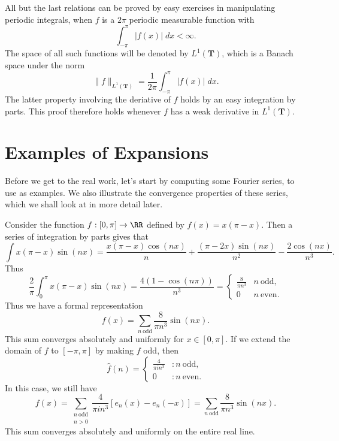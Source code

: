 All but the last relations can be proved by easy exercises in manipulating periodic integrals, when $f$ is a $2\pi$ periodic measurable function with
%
\[ \int_{-\pi}^\pi |f(x)|\; dx < \infty. \]
%
The space of all such functions will be denoted by $L^1(\mathbf{T})$, which is a Banach space under the norm
%
\[ \| f \|_{L^1(\mathbf{T})} = \frac{1}{2\pi} \int_{-\pi}^\pi |f(x)|\; dx. \]
%
The latter property involving the deriative of $f$ holds by an easy integration by parts. This proof therefore holds whenever $f$ has a weak derivative in $L^1(\mathbf{T})$.

\section{Examples of Expansions}

Before we get to the real work, let's start by computing some Fourier series, to use as examples. We also illustrate the convergence properties of these series, which we shall look at in more detail later.

\begin{example}
    Consider the function $f: [0,\pi] \to \RR$ defined by $f(x) = x(\pi - x)$. Then a series of integration by parts gives that
    \[ \int x(\pi - x) \sin(nx) = \frac{x(\pi - x) \cos(nx)}{n} + \frac{(\pi - 2x) \sin(nx)}{n^2} - \frac{2\cos(nx)}{n^3}. \]
    Thus
    \[ \frac{2}{\pi} \int_0^\pi x(\pi - x) \sin(nx) = \frac{4(1 - \cos(n\pi))}{n^3} = \begin{cases} \frac{8}{\pi n^3} & n\ \text{odd}, \\ 0 & n\ \text{even}. \end{cases}  \]
    Thus we have a formal representation
    \[ f(x) = \sum_{n\ \text{odd}} \frac{8}{\pi n^3} \sin(nx). \]
    This sum converges absolutely and uniformly for $x \in [0,\pi]$. If we extend the domain of $f$ to $[-\pi,\pi]$ by making $f$ odd, then
    \[ \hat{f}(n) = \begin{cases} \frac{4}{\pi i n^3} & : n\ \text{odd}, \\ 0 & : n\ \text{even}. \end{cases} \]
    In this case, we still have
    \[ f(x) = \sum_{\substack{n\ \text{odd}\\ n > 0}} \frac{4}{\pi i n^3} [e_n(x) - e_n(-x)] = \sum_{n\ \text{odd}} \frac{8}{\pi n^3} \sin(nx). \]
    This sum converges absolutely and uniformly on the entire real line.
\end{example}

